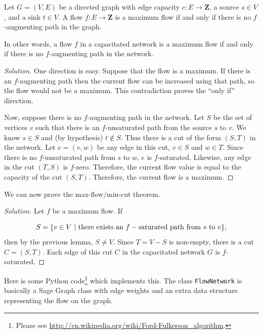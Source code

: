 \begin{lemma}
{\rm
Let $G=(V,E)$ be a directed graph with edge
capacity $c: E \to {\mathbf{Z}}$,
a source $s\in V$, and a sink $t\in V$.
A flow $f: E \to {\mathbf{Z}}$ is a maximum flow if
and only if there is no $f$-augmenting path in the graph.
}
\end{lemma}

In other words, a flow $f$ in a
capacitated network is a maximum flow if and only if
there is no $f$-augmenting path in the network.

\begin{proof}[Solution]
One direction is easy. Suppose that the flow is a maximum.
If there is an $f$-augmenting path then the
current flow can be increased using that path, so the flow would not
be a maximum. This contradiction proves the ``only if'' direction.

Now, suppose there is no $f$-augmenting path in the network.
Let $S$ be the set of vertices $v$ such that there is an $f$-unsaturated path from
the source $s$ to $v$. We know $s\in S$ and (by hypothesis)
$t\notin S$. Thus there is a cut of the form $(S,T)$ in the network.
Let $e=(v,w)$ be any edge in this cut, $v\in S$ and $w\in T$. Since
there is no $f$-unsaturated path from $s$ to $w$,
$e$ is $f$-saturated. Likewise, any edge in the cut
$(T,S)$ is $f$-zero. Therefore, the current flow value is equal to the
capacity of the cut $(S,T)$. Therefore, the current flow is a maximum.
\end{proof}

We can now prove the max-flow/min-cut theorem.

\begin{proof}[Solution]
Let $f$ be a maximum flow.
If

\[
S = \{v\in V\ |\ {\rm there\ exists\ an\ }f-{\rm saturated\ path\
  from\ }s\ {\rm to\ }v\},
\]
then by the previous lemma, $S\not= V$.
Since $T=V-S$ is non-empty, there is a cut $C=(S,T)$.
Each edge of this cut $C$ in the capacitated network $G$ is
$f$-saturated.

\end{proof}

Here is some Python code\footnote{Please see
\url{http://en.wikipedia.org/wiki/Ford-Fulkerson_algorithm}.}
which implements this. The class {\tt FlowNetwork} is basically a Sage
Graph class with edge weights and an extra data structure representing
the flow on the graph.

